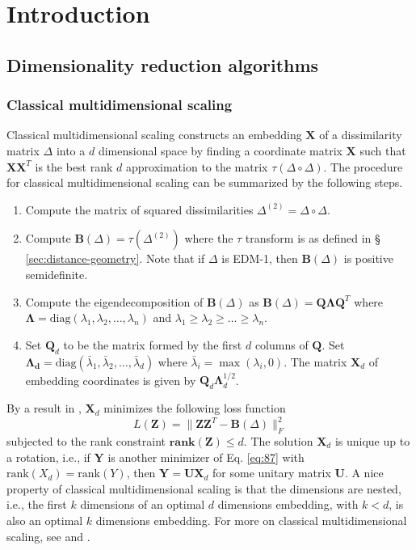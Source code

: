 \chapter{Introduction}
\label{cha:introduction}

\section{Dimensionality reduction algorithms}
\label{sec:dimens-reduct-algor}



\subsection{Classical multidimensional scaling}
\label{sec:classical-mds}
Classical multidimensional scaling \citep{torgesen52:_multid}
constructs an embedding $\mathbf{X}$ of a dissimilarity matrix
$\Delta$ into a $d$ dimensional space by finding a coordinate matrix
$\mathbf{X}$ such that $\mathbf{X}\mathbf{X}^{T}$ is the best rank $d$
approximation to the matrix $\tau(\Delta \circ \Delta)$. The procedure
for classical multidimensional scaling can be summarized by the
following steps.
\begin{enumerate}
\item Compute the matrix of squared dissimilarities $\Delta^{(2)} =
  \Delta \circ \Delta$.
\item Compute $\mathbf{B}(\Delta) = \tau(\Delta^{(2)})$ where the
  $\tau$ transform is as defined in \S
  \ref{sec:distance-geometry}. Note that if $\Delta$ is EDM-1, then
  $\mathbf{B}(\Delta)$ is positive semidefinite. 
\item Compute the eigendecomposition of $\mathbf{B}(\Delta)$ as
  $\mathbf{B}(\Delta) = \mathbf{Q} \bm{\Lambda} \mathbf{Q}^{T}$ where
  $\bm{\Lambda} = \mathrm{diag}(\lambda_1, \lambda_2, \dots,
  \lambda_n)$ and $\lambda_1 \geq \lambda_2 \geq \dots \geq
  \lambda_n$.  
\item Set $\mathbf{Q}_d$ to be the matrix formed by the first $d$
  columns of $\mathbf{Q}$. Set $\bm{\Lambda_{d}} =
  \mathrm{diag}(\bar{\lambda}_1,\bar{\lambda}_2, \dots,
  \bar{\lambda}_d)$ where $\bar{\lambda}_i = \max(\lambda_i, 0)$. The
  matrix $\mathbf{X}_d$ of embedding coordinates is given by
  $\mathbf{Q}_d \mathbf{\Lambda}_{d}^{1/2}$.
\end{enumerate}
By a result in \citet{eckart36:_approx}, $\mathbf{X}_d$ minimizes the
following loss function
\begin{equation}
  \label{eq:87}
 L(\mathbf{Z}) = \| \mathbf{Z} \mathbf{Z}^{T} - \mathbf{B}(\Delta)
 \|_F^{2} 
\end{equation}
subjected to the rank constraint $\mathbf{rank}(\mathbf{Z}) \leq
d$. The solution $\mathbf{X}_d$ is unique up to a rotation, i.e., if
$\mathbf{Y}$ is another minimizer of Eq. \eqref{eq:87} with
$\mathrm{rank}(X_d) = \mathrm{rank}(Y)$, then $\mathbf{Y} =
\mathbf{U}\mathbf{X}_d$ for some unitary matrix $\mathbf{U}$. A nice
property of classical multidimensional scaling is that the dimensions
are nested, i.e., the first $k$ dimensions of an optimal $d$
dimensions embedding, with $k < d$, is also an optimal $k$ dimensions
embedding. For more on classical multidimensional scaling, see
\citet{borg05:_moder} and \citet{gower66:_some}.
%
%
